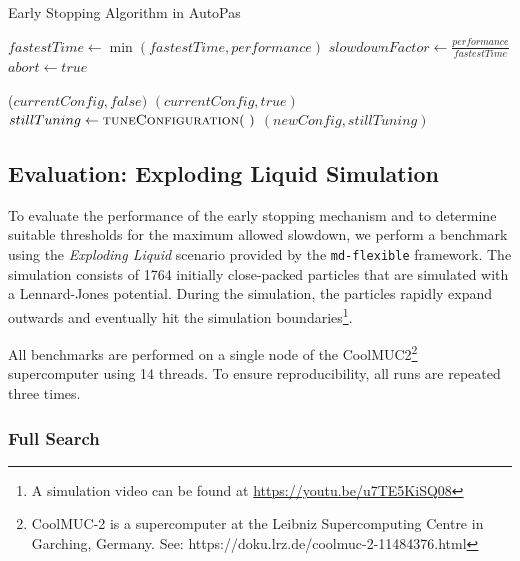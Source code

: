 \documentclass[conference]{IEEEtran}
\begin{document}
\begin{algorithm}[H]
    \small
    \caption{Early Stopping Algorithm in AutoPas}
    \label{alg_early_stopping}
    \begin{algorithmic}[1]
        \State $fastestTime \gets \min(fastestTime, performance)$
        \State $slowdownFactor \gets \frac{performance}{fastestTime}$
        \State $abort \gets true$
        \EndIf
        \EndProcedure

        \vspace{0.5em}

        \State \Return ($currentConfig, false)$
            \State \Return $(currentConfig, true)$
            \Else
            \State $stillTuning \gets \Call{tuneConfiguration}{~}$
            \State \Return $(newConfig, stillTuning)$
        \EndIf
        \EndProcedure
    \end{algorithmic}

\end{algorithm}



\subsection{Evaluation: Exploding Liquid Simulation}
\label{sec:evaluation}

To evaluate the performance of the early stopping mechanism and to determine suitable thresholds for the maximum allowed slowdown, we perform a benchmark using the \textit{Exploding Liquid} scenario provided by the \texttt{md-flexible} framework. The simulation consists of 1764 initially close-packed particles that are simulated with a Lennard-Jones potential. During the simulation, the particles rapidly expand outwards and eventually hit the simulation boundaries\footnote{A simulation video can be found at \url{https://youtu.be/u7TE5KiSQ08}}.

All benchmarks are performed on a single node of the CoolMUC2\footnote{CoolMUC-2 is a supercomputer at the Leibniz Supercomputing Centre in Garching, Germany. See: https://doku.lrz.de/coolmuc-2-11484376.html} supercomputer using 14 threads. To ensure reproducibility, all runs are repeated three times.

\subsubsection{Full Search}
\end{document}
